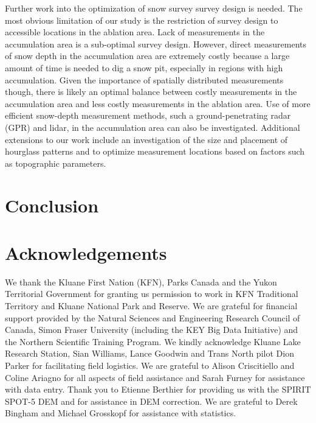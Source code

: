 \documentclass[twocolumn,letterpaper]{igs}
\begin{document}
Further work into the optimization of snow survey survey design is needed. The most obvious limitation of our study is the restriction of survey design to accessible locations in the ablation area. Lack of measurements in the accumulation area is a sub-optimal survey design. However, direct measurements of snow depth in the accumulation area are extremely costly because a large amount of time is needed to dig a snow pit, especially in regions with high accumulation. Given the importance of spatially distributed measurements though, there is likely an optimal balance between costly measurements in the accumulation area and less costly measurements in the ablation area. Use of more efficient snow-depth measurement methods, such a ground-penetrating radar (GPR) and lidar, in the accumulation area can also be investigated. Additional extensions to our work include an investigation of the size and placement of hourglass patterns and to optimize measurement locations based on factors such as topographic parameters. 


\section{Conclusion}


\section{Acknowledgements}

We thank the Kluane First Nation (KFN), Parks Canada and the Yukon Territorial Government for granting us permission to work in KFN Traditional Territory and Kluane National Park and Reserve. We are grateful for financial support provided by the Natural Sciences and Engineering Research Council of  Canada, Simon Fraser University (including the KEY Big Data Initiative) and the Northern Scientific Training Program. We kindly acknowledge Kluane Lake Research Station, Sian Williams, Lance Goodwin and Trans North pilot Dion Parker for facilitating field logistics. We are grateful to Alison Criscitiello and Coline Ariagno for all aspects of field assistance and Sarah Furney for assistance with data entry. Thank you to Etienne Berthier for providing us with the SPIRIT SPOT-5 DEM and for assistance in DEM correction. We are grateful to Derek Bingham and Michael Grosskopf for assistance with statistics. 



%
%

%


\end{document}
